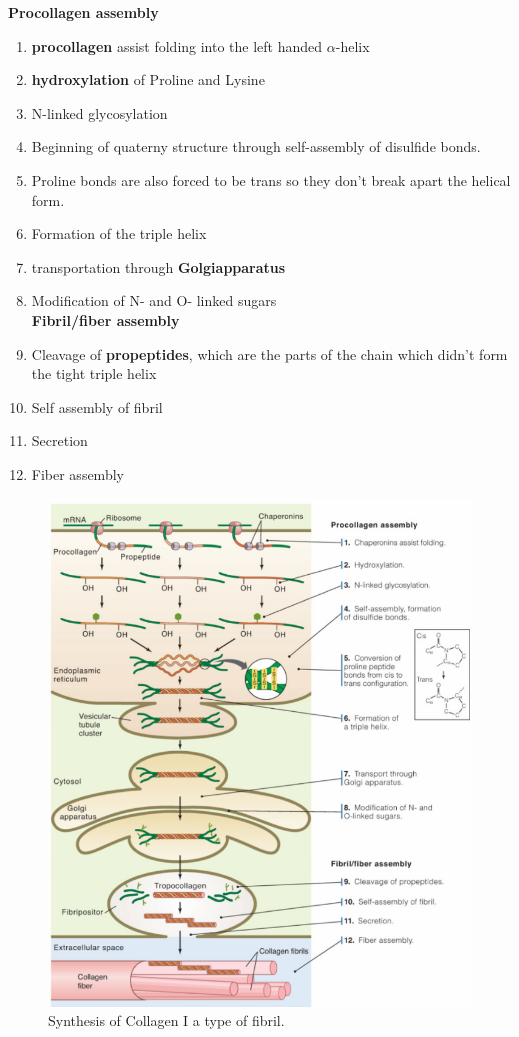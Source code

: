 \documentclass[../main.tex]{subfiles}
\begin{document}
\textbf{Procollagen assembly}
\begin{enumerate}
	\item \textbf{\gls{procollagen}} assist folding into the left handed $\alpha$-helix
	\item \textbf{\gls{hydroxylation}} of Proline and Lysine
	\item N-linked glycosylation
	\item Beginning of quaterny structure through self-assembly of disulfide bonds.
	\item Proline bonds are also forced to be trans so they don't break apart the helical form.
	\item Formation of the triple helix
	\item transportation through \textbf{\gls{Golgiapparatus}}
	\item Modification of N- and O- linked sugars \\
	
	\textbf{Fibril/fiber assembly}
	\item Cleavage of \textbf{\gls{propeptides}}, which are the parts of the chain which didn't form the tight triple helix
	\item Self assembly of fibril
	\item Secretion
	\item Fiber assembly
\end{enumerate}

\begin{figure}[H]
	\centering
	\includegraphics[width=0.6\linewidth]{coll_synt}
	\caption{Synthesis of Collagen I a type of fibril.}
	\label{fig:collsynt}
\end{figure}
\end{document}
